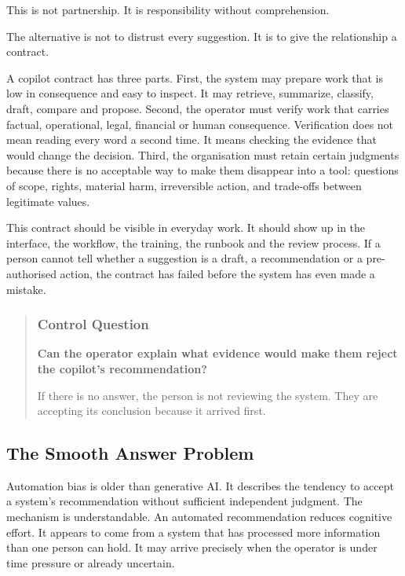 This is not partnership. It is responsibility without comprehension.

The alternative is not to distrust every suggestion. It is to give the
relationship a contract.

A copilot contract has three parts. First, the system may prepare work
that is low in consequence and easy to inspect. It may retrieve,
summarize, classify, draft, compare and propose. Second, the operator
must verify work that carries factual, operational, legal, financial or
human consequence. Verification does not mean reading every word a
second time. It means checking the evidence that would change the
decision. Third, the organisation must retain certain judgments because
there is no acceptable way to make them disappear into a tool: questions
of scope, rights, material harm, irreversible action, and trade-offs
between legitimate values.

This contract should be visible in everyday work. It should show up in
the interface, the workflow, the training, the runbook and the review
process. If a person cannot tell whether a suggestion is a draft, a
recommendation or a pre-authorised action, the contract has failed
before the system has even made a mistake.

\begin{quote}
\subsubsection{Control Question}\label{control-question}

\textbf{Can the operator explain what evidence would make them reject
the copilot's recommendation?}

If there is no answer, the person is not reviewing the system. They are
accepting its conclusion because it arrived first.
\end{quote}

\subsection{The Smooth Answer Problem}\label{the-smooth-answer-problem}

Automation bias is older than generative AI. It describes the tendency
to accept a system's recommendation without sufficient independent
judgment. The mechanism is understandable. An automated recommendation
reduces cognitive effort. It appears to come from a system that has
processed more information than one person can hold. It may arrive
precisely when the operator is under time pressure or already uncertain.

